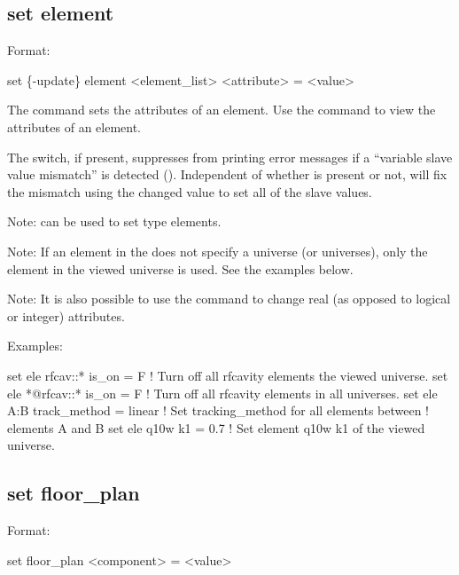 {{%

\subsection{set element}
\label{s:set.element}

Format:
\begin{example}
  set \{-update\} element <element_list> <attribute> = <value>
\end{example}

The  command sets the attributes of an element. Use the 
command to view the attributes of an element.

The  switch, if present, suppresses \tao from printing error messages if a ``variable
slave value mismatch'' is detected (). Independent of whether  is
present or not, \tao will fix the mismatch using the changed value to set all of the slave values.

Note:  can be used to set  type elements.

Note: If an element in the  does not specify a universe (or universes),
only the element in the viewed universe is used. See the examples below.

Note: It is also possible to use the  command to change
real (as opposed to logical or integer) attributes.

Examples:
\begin{example}
  set ele rfcav::* is_on = F        ! Turn off all rfcavity elements the viewed universe.
  set ele *@rfcav::* is_on = F      ! Turn off all rfcavity elements in all universes.
  set ele A:B track_method = linear ! Set tracking_method for all elements between 
                                    !   elements A and B
  set ele q10w k1 = 0.7             ! Set element q10w k1 of the viewed universe.
\end{example}


\subsection{set floor_plan}
\label{s:set.floor.plan}

Format:
\begin{example}
  set floor_plan <component> = <value>
\end{example}


}}
